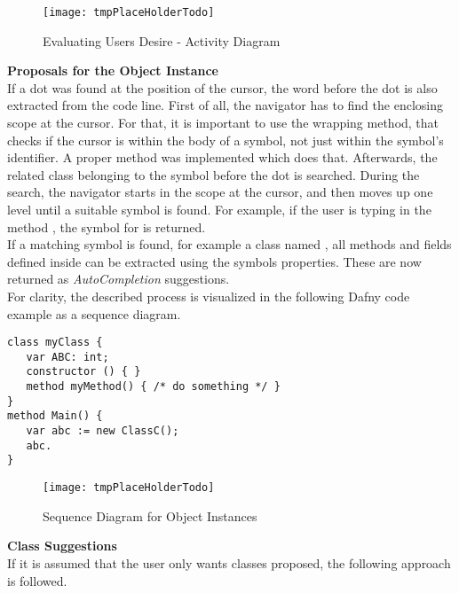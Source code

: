 \begin{figure}[H]
    \centering
    \texttt{[image: tmpPlaceHolderTodo]}
    \caption{Evaluating Users Desire - Activity Diagram}
    \label{fig:get_users_desire}
\end{figure}

\textbf{Proposals for the Object Instance}\\
If a dot was found at the position of the cursor, the word before the dot is also extracted from the code line.
First of all, the navigator has to find the enclosing scope at the cursor.
For that, it is important to use the wrapping method, that checks if the cursor is within the body of a symbol, not just within the symbol's identifier.
A proper method was implemented which does that.
Afterwards, the related class belonging to the symbol before the dot is searched.
During the search, the navigator starts in the scope at the cursor, and then moves up one level until a suitable symbol is found.
For example, if the user is typing in the method , the symbol for  is returned. \\

If a matching symbol is found, for example a class named , all methods and fields defined inside 
can be extracted using the symbols properties.
These are now returned as \textit{AutoCompletion} suggestions. \\

For clarity, the described process is visualized in the following
Dafny code example  as a sequence diagram.

\begin{lstlisting}[language=dafny, caption={tmptodo.dfy}, captionpos=b, label={lst:tmptodo}]
class myClass {
   var ABC: int;
   constructor () { }
   method myMethod() { /* do something */ }
}
method Main() {
   var abc := new ClassC();
   abc.
}
\end{lstlisting}


\begin{figure}[H]
    \centering
    \texttt{[image: tmpPlaceHolderTodo]}
    \caption{Sequence Diagram for Object Instances}
    \label{fig:object_completion_diagram}
\end{figure}

\textbf{Class Suggestions}\\
If it is assumed that the user only wants classes proposed, the following approach is followed.

